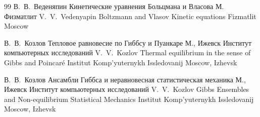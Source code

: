 \begin{thebibliography}{99}
\by В.~В.~Веденяпин
\book Кинетические уравнения Больцмана и Власова
\publaddr М.
\publ Физматлит
\misctransl
\by V.~V.~Vedenyapin
\book Boltzmann and Vlasov Kinetic equations
\publ Fizmatlit
\publaddr Moscow 

\by В.~В.~Козлов
\book Тепловое равновесие по Гиббсу и Пуанкаре
\publaddr М., Ижевск
\publ Институт компьютерных исследований
\misctransl
\by V.~V.~Kozlov 
\book Thermal equilibrium in the sense of Gibbs and Poincar\'e
\publ Institut Komp'yuternykh Issledovanij
\publaddr Moscow, Izhevsk



\by В.~В.~Козлов
\book Ансамбли Гиббса и неравновесная статистическая механика
\publaddr М., Ижевск
\publ Институт компьютерных исследований
\misctransl
\by V.~V.~Kozlov
\book Gibbs Ensembles and Non-equilibrium Statistical Mechanics
\publ Institut Komp'yuternykh Issledovanij
\publaddr Moscow, Izhevsk


\end{thebibliography}

\noindent
\hskip6.5cm \thedate \par\noindent
\hskip6.5cm\therevdate
%




%

\makeengtitle

\renewcommand{\baselinestretch}{0.9}


\newpage
%
%
%
